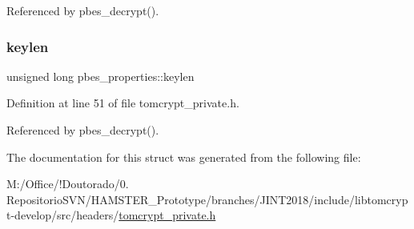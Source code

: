 Referenced by pbes\+\_\+decrypt().

\mbox{\label{structpbes__properties_ad29dce0a2ea0da6e3007fbf220383ae4}} 
\subsubsection{\texorpdfstring{keylen}{keylen}}
{\footnotesize\ttfamily unsigned long pbes\+\_\+properties\+::keylen}



Definition at line 51 of file tomcrypt\+\_\+private.\+h.



Referenced by pbes\+\_\+decrypt().



The documentation for this struct was generated from the following file\+:\begin{DoxyCompactItemize}
\item 
M\+:/\+Office/!\+Doutorado/0. Repositorio\+S\+V\+N/\+H\+A\+M\+S\+T\+E\+R\+\_\+\+Prototype/branches/\+J\+I\+N\+T2018/include/libtomcrypt-\/develop/src/headers/\mbox{\hyperlink{tomcrypt__private_8h}{tomcrypt\+\_\+private.\+h}}\end{DoxyCompactItemize}

